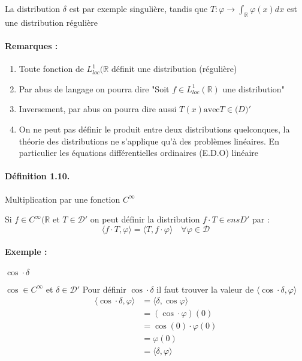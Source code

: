 \documentclass[12pt,a4paper]{report}
\newcommand{\Ens}[1]{\ensuremath{\mathbb{#1}}}
\newcommand{\ens}[1]{\ensuremath{\mathbb{#1}}}
\newcommand{\D}{\ensuremath{\mathcal{D}}}
\begin{document}
La distribution \(\delta\) est par exemple singulière, tandis que \(T : \varphi \rightarrow \int_{\Ens{R}} \varphi(x) dx\) est une distribution régulière

\paragraph{Remarques :}
\begin{enumerate}
	\item Toute fonction de \(L^1_{loc}(\ens{R}\) définit une distribution (régulière)
	\item Par abus de langage on pourra dire "Soit \(f \in L^1_{loc} (\ens{R})\) une distribution"
	\item Inversement, par abus on pourra dire aussi \(T(x) \text{avec} T \in \ens(D)'\)
	\item On ne peut pas définir le produit entre deux distributions quelconques, la théorie des distributions ne s'applique qu'à des problèmes linéaires. En particulier les équations différentielles ordinaires (E.D.O) linéaire
\end{enumerate}

\paragraph{Définition 1.10.} Multiplication par une fonction \(C^{\infty}\)

Si \(f \in C^{\infty}(\ens{R} \) et \(T\in \D'\) on peut définir la distribution \(f\cdot T \in ens{D}'\) par :
\[
	\langle f\cdot T, \varphi \rangle = \langle T, f\cdot \varphi \rangle \quad \forall \varphi \in \D
\]

\paragraph{Exemple :} \(\cos \cdot \delta\)

\(\cos \in C^{\infty}\) et \(\delta \in \D'\)
Pour définir \(\cos \cdot \delta\) il faut trouver la valeur de \(\langle \cos \cdot \delta, \varphi \rangle\)
\begin{align*}
	\langle \cos \cdot \delta, \varphi \rangle &= \langle \delta, \cos \varphi \rangle\\
	&= (\cos \cdot \varphi)(0)\\
	&= \cos(0) \cdot \varphi(0)\\
	&= \varphi (0)\\
	&= \langle \delta, \varphi \rangle
\end{align*}
\end{document}
